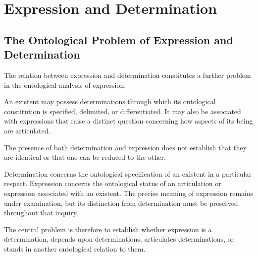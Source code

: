 %
%

\section{Expression and Determination}
\label{sec:expression-and-determination}

\subsection{The Ontological Problem of Expression and Determination}

The relation between expression and determination constitutes
a further problem in the ontological analysis of expression.

An existent may possess determinations through which
its ontological constitution is specified, delimited,
or differentiated. It may also be associated with
expressions that raise a distinct question concerning
how aspects of its being are articulated.

The presence of both determination and expression
does not establish that they are identical or that
one can be reduced to the other.

Determination concerns the ontological specification
of an existent in a particular respect. Expression
concerns the ontological status of an articulation
or expression associated with an existent. The precise
meaning of expression remains under examination,
but its distinction from determination must be
preserved throughout that inquiry.

The central problem is therefore to establish whether
expression is a determination, depends upon determinations,
articulates determinations, or stands in another
ontological relation to them.

